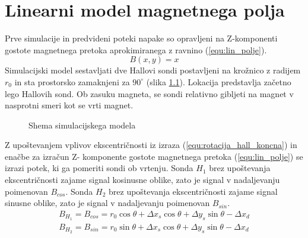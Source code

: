﻿\chapter{Linearni model magnetnega polja}
Prve simulacije in predvideni poteki napake so opravljeni na Z-komponenti gostote magnetnega pretoka aprokimiranega z ravnino (\ref{equ:lin_polje}).
\begin{equation}
\label{equ:lin_polje}
B(x,y)= x
\end{equation}
Simulacijski model sestavljati dve Hallovi sondi postavljeni na krožnico z radijem $r_0$ in sta prostorsko zamaknjeni za $90^\circ$ (slika \ref{lin_simul}). Lokacija predstavlja začetno lego Hallovih sond. 
Ob zasuku magneta, se sondi relativno gibljeti na magnet v nasprotni smeri kot se vrti magnet. 
\begin{figure}[h!]
	\centering
	\caption{Shema simulacijskega modela}
	\label{lin_simul}
\end{figure}

Z upoštevanjem vplivov ekscentričnosti iz izraza (\ref{equ:rotacija_hall_koncna}) in enačbe za izračun Z- komponente gostote magnetnega pretoka (\ref{equ:lin_polje}) se izrazi potek, ki ga pomeriti sondi ob vrtenju. Sonda $H_1$ brez upoštevanja ekscentričnosti zajame signal kosinusne oblike, zato je signal v nadaljevanju poimenovan $B_{cos}$. Sonda $H_2$ brez upoštevanja ekscentričnosti zajame signal sinusne oblike, zato je signal v nadaljevanju poimenovan $B_{sin}$.
\begin{eqnarray}
\label{equ:lin_potek_sin}
B_{H_1}= B_{cos}= r_0 \cos \theta + \Delta x_s \cos \theta+ \Delta y_s \sin \theta -\Delta x_d\\
\label{equ:lin_potek_cos}
B_{H_2}= B_{sin}= r_0 \sin \theta + \Delta x_s \cos \theta+ \Delta y_s \sin \theta -\Delta x_d
\end{eqnarray}

